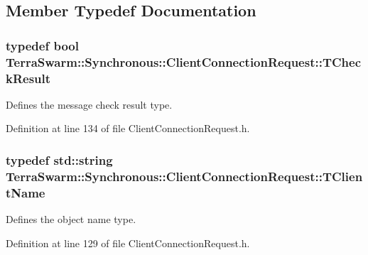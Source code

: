 \subsection{Member Typedef Documentation}
\hypertarget{class_terra_swarm_1_1_synchronous_1_1_client_connection_request_af97d7c46396bc29dd8a2628f32a434f2}{
\subsubsection[{T\-Check\-Result}]{\setlength{\rightskip}{0pt plus 5cm}typedef bool {\bf Terra\-Swarm\-::\-Synchronous\-::\-Client\-Connection\-Request\-::\-T\-Check\-Result}}}\label{class_terra_swarm_1_1_synchronous_1_1_client_connection_request_af97d7c46396bc29dd8a2628f32a434f2}


Defines the message check result type. 



Definition at line 134 of file Client\-Connection\-Request.\-h.

\hypertarget{class_terra_swarm_1_1_synchronous_1_1_client_connection_request_a7d85ca6773adf2b3b32cfbff9706f882}{
\subsubsection[{T\-Client\-Name}]{\setlength{\rightskip}{0pt plus 5cm}typedef std\-::string {\bf Terra\-Swarm\-::\-Synchronous\-::\-Client\-Connection\-Request\-::\-T\-Client\-Name}}}\label{class_terra_swarm_1_1_synchronous_1_1_client_connection_request_a7d85ca6773adf2b3b32cfbff9706f882}


Defines the object name type. 



Definition at line 129 of file Client\-Connection\-Request.\-h.



